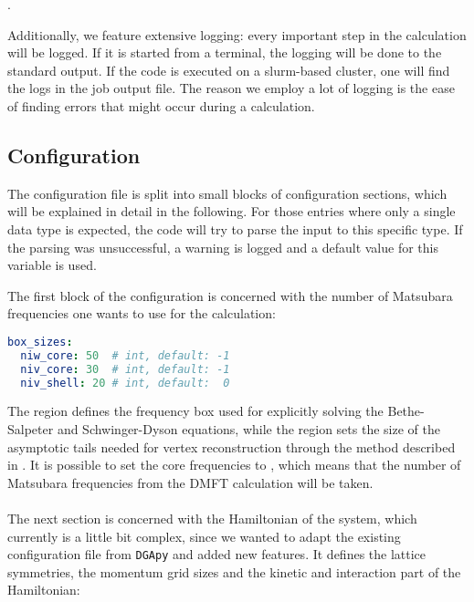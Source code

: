 \documentclass[../../main.tex]{subfiles}
\begin{document}
\mbox{}.

Additionally, we feature extensive logging: every important step in the calculation will be logged. If it is started from a terminal, the logging will be done to the standard output. If the code is executed on a slurm-based cluster, one will find the logs in the job output file. The reason we employ a lot of logging is the ease of finding errors that might occur during a calculation.

\subsection{Configuration}

The configuration file is split into small blocks of configuration sections, which will be explained in detail in the following. For those entries where only a single data type is expected, the code will try to parse the input to this specific type. If the parsing was unsuccessful, a warning is logged and a default value for this variable is used. 

The first block of the configuration is concerned with the number of Matsubara frequencies one wants to use for the calculation:

\begin{minipage}{\textwidth}%
\begin{lstlisting}[language=yaml]
box_sizes:
  niw_core: 50  # int, default: -1
  niv_core: 30  # int, default: -1
  niv_shell: 20 # int, default:  0
\end{lstlisting}
\end{minipage}
The  region defines the frequency box used for explicitly solving the Bethe-Salpeter and Schwinger-Dyson equations, while the  region sets the size of the asymptotic tails needed for vertex reconstruction through the method described in . It is possible to set the core frequencies to , which means that the number of Matsubara frequencies from the DMFT calculation will be taken.
\\\\
The next section is concerned with the Hamiltonian of the system, which currently is a little bit complex, since we wanted to adapt the existing configuration file from \texttt{DGApy} and added new features. It defines the lattice symmetries, the momentum grid sizes and the kinetic and interaction part of the Hamiltonian:
\end{document}
